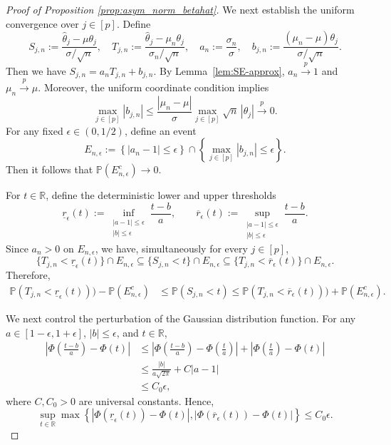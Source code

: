 \documentclass[12pt,reqno]{amsart}
\newcommand{\pr}{\mathbb{P}}
\newcommand{\ccc}{\color{black}}
\renewcommand{\hat}{\widehat}
\newcommand{\pconv}{\overset{{p}}{\to}}
\begin{document}
\begin{proof}[Proof of Proposition \ref{prop:asym_norm_betahat}]
{\ccc
We next establish the uniform convergence over $j\in[p]$.  
Define
\[
S_{j,n}:=
\frac{\hat\theta_j-\mu\theta_j}{\sigma/\sqrt n},
\quad
T_{j,n}:=
\frac{\hat\theta_j-\mu_n\theta_j}{\sigma_n/\sqrt n},
\quad
a_n:=\frac{\sigma_n}{\sigma},
\quad
b_{j,n}
:=
\frac{(\mu_n-\mu)\theta_j}{\sigma/\sqrt n}.
\]
Then we have $S_{j,n}=a_nT_{j,n}+b_{j,n}.$
By Lemma~\ref{lem:SE-approx}, $a_n\pconv1$ and $\mu_n\pconv\mu.$
Moreover, the uniform coordinate condition implies
\[
\max_{j\in[p]}|b_{j,n}|
\le
\frac{|\mu_n-\mu|}{\sigma}
\max_{j\in[p]}\sqrt n\,|\theta_j|
\pconv0.
\]
For any fixed $\epsilon\in(0,1/2)$, define an event
\[
E_{n,\epsilon}
:=\left\{
|a_n-1|\le\epsilon
\right\}
\cap
\left\{
\max_{j\in[p]}|b_{j,n}|\le\epsilon
\right\}.
\]
Then it follows that $\pr(E_{n,\epsilon}^c)\to0$.

For $t\in\mathbb R$, define the deterministic lower and upper thresholds
\[
\underline r_\epsilon(t)
:=
\inf_{\substack{|a-1|\le\epsilon\\|b|\le\epsilon}}
\frac{t-b}{a},
\qquad
\overline r_\epsilon(t)
:=
\sup_{\substack{|a-1|\le\epsilon\\|b|\le\epsilon}}
\frac{t-b}{a}.
\]
Since $a_n>0$ on $E_{n,\epsilon}$, we have, simultaneously for every
$j\in[p]$,
\[
\{T_{j,n}<\underline r_\epsilon(t)\}
\cap E_{n,\epsilon}
\subseteq
\{S_{j,n}<t\}
\cap E_{n,\epsilon}
\subseteq
\{T_{j,n}<\overline r_\epsilon(t)\}
\cap E_{n,\epsilon}.
\]
Therefore,
\begin{align}
\pr(T_{j,n}<\underline r_\epsilon(t)))
-\pr(E_{n,\epsilon}^c)
&\le
\pr(S_{j,n}<t)
\le
\pr(T_{j,n}<\overline r_\epsilon(t)))
+\pr(E_{n,\epsilon}^c).
\label{eq:uniform-sandwich}
\end{align}

We next control the perturbation of the Gaussian distribution function.
For any $a\in[1-\epsilon,1+\epsilon]$, $|b|\le\epsilon$, and
$t\in\mathbb R$,
\begin{align*}
\left|
\Phi\left(\frac{t-b}{a}\right)-\Phi(t)
\right|
&\le
\left|
\Phi\left(\frac{t-b}{a}\right)
-
\Phi\left(\frac{t}{a}\right)
\right|
+
\left|
\Phi\left(\frac{t}{a}\right)-\Phi(t)
\right|\\
&\le
\frac{|b|}{a\sqrt{2\pi}}
+
C|a-1|\\
&\le
C_0\epsilon,
\end{align*}
where $C,C_0>0$ are universal constants. Hence,
\[
\sup_{t\in\mathbb R}
\max\left\{
\left|\Phi(\underline r_\epsilon(t))-\Phi(t)\right|,
\left|\Phi(\overline r_\epsilon(t))-\Phi(t)\right|
\right\}
\le C_0\epsilon.
\]

}
\end{proof}
\end{document}
